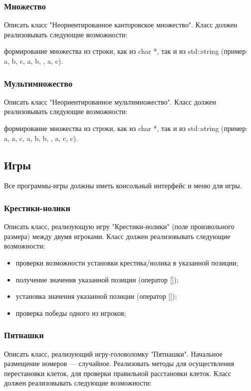 \documentclass[a4paper,12pt]{article}
\begin{document}
\subsubsection{Множество}

Описать класс "Неориентированное канторовское множество".  Класс
должен реализовывать следующие возможности:

формирование множества из строки, как из char *, так и из std::string (пример: {a, b, c, {a, b}, {}, {a, {c}}}). 

\subsubsection{Мультимножество}

Описать класс "Неориентированное мультимножество".
Класс должен реализовывать следующие возможности:

формирование множества из строки, как из char *, так и из std::string (пример: {a, a, c, {a, b, b}, {}, {a, {c, c}}}). 


\subsection{Игры}

Все программы-игры должны иметь консольный интерфейс и меню для игры.

\subsubsection{Крестики-нолики}

Описать класс, реализующую игру "Крестики-нолики" (поле произвольного размера) между двумя игроками.
Класс должен реализовывать следующие возможности:

\begin{itemize}
\item проверки возможности установки крестика/нолика в указанной
  позиции;
\item получение значения указанной позиции (оператор []);
\item установка значения указанной позиции (оператор []);
\item проверка победы одного из игроков;
\end{itemize}

\subsubsection{Пятнашки}

Описать класс, реализующий игру-головоломку "Пятнашки". Начальное
размещение номеров — случайное. Реализовать методы для осуществления
перестановки клеток, для проверки правильной расстановки клеток.
Класс должен реализовывать следующие возможности:
\end{document}
